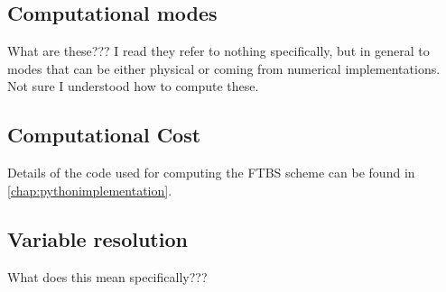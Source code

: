\subsection{Computational modes}
What are these??? I read they refer to nothing specifically, but in general to modes that can be either physical or coming from numerical implementations. Not sure I understood how to compute these.

\subsection{Computational Cost}
Details of the code used for computing the FTBS scheme can be found in \ref{chap:pythonimplementation}.

\subsection{Variable resolution}
What does this mean specifically???
